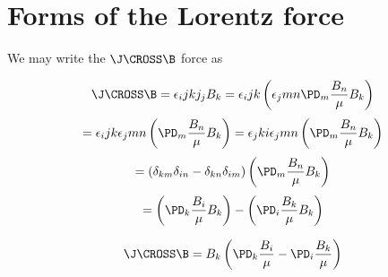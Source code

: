 \documentclass[11pt]{article}
\begin{document}
\doublespacing
\MOONSTITLE
\maketitle

\section{Forms of the Lorentz force}

We may write the $\J\CROSS \B$ force as

\begin{equation}
	\J\CROSS \B = \epsilon_ijk j_j B_k =
	\epsilon_ijk \left( \epsilon_jmn \PD_m \frac{B_n}{\mu} B_k \right)
\end{equation}
\begin{equation}
	= \epsilon_ijk \epsilon_jmn \left( \PD_m \frac{B_n}{\mu} B_k \right)
	= \epsilon_jki \epsilon_jmn \left( \PD_m \frac{B_n}{\mu} B_k \right)
\end{equation}
\begin{equation}
	= (\delta_{km} \delta_{in} - \delta_{kn} \delta_{im} ) \left( \PD_m \frac{B_n}{\mu} B_k \right)
\end{equation}
\begin{equation}
	= \left( \PD_k \frac{B_i}{\mu} B_k \right) -
	\left( \PD_i \frac{B_k}{\mu} B_k \right)
\end{equation}

\begin{equation}
	\J \CROSS \B = B_k
	\left( \PD_k \frac{B_i}{\mu} - \PD_i \frac{B_k}{\mu} \right)
\end{equation}
\end{document}
